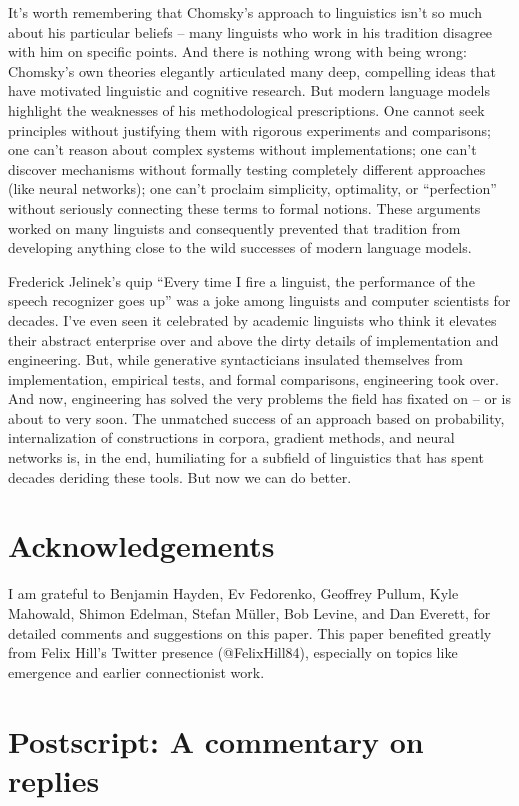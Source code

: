 \documentclass[output=paper,colorlinks,citecolor=brown]{langscibook}
\begin{document}
It's worth remembering that Chomsky's approach to linguistics isn't so much about his particular beliefs -- many linguists who work in his tradition disagree with him on specific points. And there is nothing wrong with being wrong: Chomsky's own theories elegantly articulated many deep, compelling ideas that have motivated linguistic and cognitive research. But modern language models highlight the weaknesses of his methodological prescriptions. One cannot seek principles without justifying them with rigorous experiments and comparisons; one can't reason about complex systems without implementations; one can't discover mechanisms without formally testing completely different approaches (like neural networks); one can't proclaim simplicity, optimality, or ``perfection'' without seriously connecting these terms to formal notions. These arguments worked on many linguists and consequently prevented that tradition from developing anything close to the wild successes of modern language models.

Frederick Jelinek's quip ``Every time I fire a linguist, the performance of the speech recognizer goes up'' \citep{jelinek1988applying} was a joke among linguists and computer scientists for decades. I've even seen it celebrated by academic linguists who think it elevates their abstract enterprise over and above the dirty details of implementation and engineering. But, while generative syntacticians insulated themselves from implementation, empirical tests, and formal comparisons, engineering took over. And now, engineering has solved the very problems the field has fixated on -- or is about to very soon. The unmatched success of an approach based on probability, internalization of constructions in corpora, gradient methods, and neural networks is, in the end, humiliating for a subfield of linguistics that has spent decades deriding these tools. But now we can do better. 


\section*{Acknowledgements}

I am grateful to Benjamin Hayden, Ev Fedorenko, Geoffrey Pullum, Kyle Mahowald, Shimon Edelman, Stefan Müller, Bob Levine, and Dan Everett, for detailed comments and suggestions on this paper. This paper benefited greatly from Felix Hill's Twitter presence (@FelixHill84), especially on topics like emergence and earlier connectionist work. 


\section*{Postscript: A commentary on replies}
\end{document}
